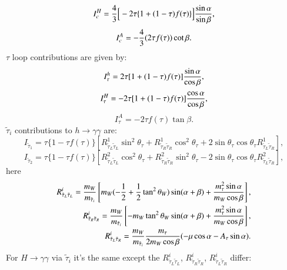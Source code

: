 \documentclass[final,3p,times,pdflatex]{elsarticle}
\begin{document}
\begin{equation}
I_{c}^H = {4 \over 3}\Big[-2\tau\{1+(1-\tau)f(\tau)\}\Big]{\sin\alpha \over \sin\beta},
\end{equation}
\begin{equation}
I_{c}^A = -{4 \over 3}(2\tau f(\tau))\cot \beta.
\end{equation}
$\tau$ loop contributions are given by:
\begin{equation}
I_{\tau}^h = 2\tau[1+(1-\tau)f(\tau)]{\sin\alpha \over \cos\beta},
\end{equation}
\begin{equation}
I_{\tau}^H = -2\tau[1+(1-\tau)f(\tau)]{\cos\alpha \over \cos\beta},
\end{equation}
\begin{equation}
I_{\tau}^A = -2\tau f(\tau) \tan\beta.
\end{equation}
$\tilde{\tau}_i$ contributions to $h \rightarrow \gamma \gamma$ are: 
\begin{equation}
I_{\tilde{\tau}_1} = \tau\{1-\tau f(\tau)\}\left[R_{\tilde{\tau}_L \tilde{\tau}_L}^1 \sin^2 \theta_\tau + R_{\tilde{\tau}_R \tilde{\tau}_R}^1 \cos^2 \theta_\tau + 2 \sin \theta_\tau \cos\theta_\tau R_{\tilde{\tau}_L \tilde{\tau}_R}^1\right],
\end{equation}
\begin{equation}
I_{\tilde{\tau}_2} = \tau\{1-\tau f(\tau)\}\left[R_{\tilde{\tau}_L \tilde{\tau}_L}^2 \cos^2 \theta_\tau + R_{\tilde{\tau}_R \tilde{\tau}_R}^2 \sin^2 \theta_\tau - 2 \sin \theta_\tau \cos\theta_\tau R_{\tilde{\tau}_L \tilde{\tau}_R}^2\right],
\end{equation}
here
\begin{align}
R_{\tilde{\tau}_L \tilde{\tau}_L}^i = {m_W \over m_{\tilde{\tau}_i}} \left[m_W (-{1 \over 2}+{1 \over 2}\tan^2 \theta_W)\sin(\alpha+\beta) + {m_{\tau}^2 \sin\alpha \over m_W \cos \beta}\right], \\
R_{\tilde{\tau}_R \tilde{\tau}_R}^i = {m_W \over m_{\tilde{\tau}_i}} \left[-m_W \tan^2 \theta_W\sin(\alpha+\beta) + {m_{\tau}^2 \sin\alpha \over m_W \cos \beta}\right], \\
R_{\tilde{\tau}_L \tilde{\tau}_R}^i = {m_W \over m_{\tilde{\tau}_i}} {m_\tau \over 2 m_W \cos \beta}(-\mu\cos\alpha -A_\tau \sin\alpha).
\end{align}
For $H \rightarrow \gamma \gamma$ via $\tilde{\tau}_i$ it's the same except the $R_{\tilde{\tau}_L \tilde{\tau}_L}^i$, $R_{\tilde{\tau}_R \tilde{\tau}_R}^i$, $R_{\tilde{\tau}_L \tilde{\tau}_R}^i$ differ:
\end{document}
